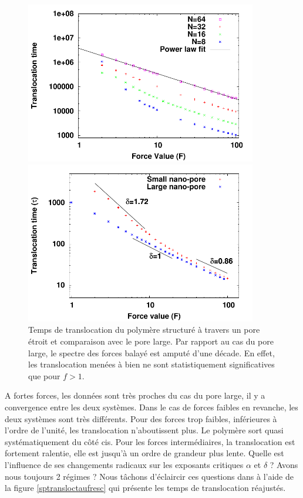 \begin{figure}[H]
\begin{center}
\includegraphics[width=0.9\textwidth]{sptransloc.pdf}

\includegraphics[width=0.9\textwidth]{complargenarrowtransloc.pdf} 
\caption[Temps de translocations du polymère structuré, comparaison]{Temps de translocation du polymère structuré à travers un pore étroit et comparaison avec le pore large. Par rapport au cas du pore large, le spectre des forces balayé est amputé d'une décade. En effet, les translocation menées à bien ne sont statistiquement significatives que pour $f>1$.}
\label{sptransloc}
\end{center}
\end{figure}


A fortes forces, les données sont très proches du cas du pore large, il y a convergence entre les deux systèmes. Dans le cas de forces faibles en revanche, les deux systèmes sont très différents. Pour des forces trop faibles, inférieures à l'ordre de l'unité, les translocation n'aboutissent plus. Le polymère sort quasi systématiquement du côté cis. Pour les forces intermédiaires, la translocation est fortement ralentie, elle est jusqu'à un ordre de grandeur plus lente. Quelle est l'influence de ses changements radicaux sur les exposants critiques $\alpha$ et $\delta$ ? Avons nous toujours 2 régimes ? Nous tâchons d'éclaircir ces questions dans à l'aide de la figure \ref{sptransloctaufresc} qui présente les temps de translocation réajustés.


